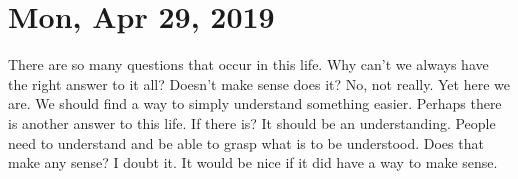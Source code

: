\section{Mon, Apr 29, 2019}

There are so many questions that occur in this life. Why can't we always have the 
right answer to it all? Doesn't make sense does it? No, not really. Yet here
we are. We should find a way to simply understand something easier. Perhaps there
is another answer to this life. If there is? It should be an understanding. People
need to understand and be able to grasp what is to be understood. Does that make
any sense? I doubt it. It would be nice if it did have a way to make sense.